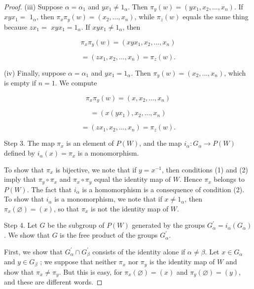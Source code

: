 \begin{proof}
(iii) Suppose \(\alpha = {\alpha }_{1}\) and \(yx_{1} \neq {1}_{\alpha }\). Then \({\pi }_{y}( w) = ( {yx_{1},x_{2},\ldots ,x_{n}})\). If \({xy}x_{1} =\) \(1_{\alpha }\), then \({\pi }_{x}{\pi }_{y}( w) = ( {x_{2},\ldots ,x_{n}})\), while \({\pi }_{z}( w)\) equals the same thing because \(zx_{1} =\) \({xy}x_{1} = 1_{\alpha }\). If \({xy}x_{1} \neq {1}_{\alpha }\), then

\[
{\pi }_{x}{\pi }_{y}( w) = ( {{xy}x_{1},x_{2},\ldots ,x_{n}})
\]

\[
= ( {zx_{1},x_{2},\ldots ,x_{n}}) = {\pi }_{z}( w).
\]

(iv) Finally, suppose \(\alpha = {\alpha }_{1}\) and \(yx_{1} = 1_{\alpha }\). Then \({\pi }_{y}( w) = ( {x_{2},\ldots ,x_{n}})\), which is empty if \(n = 1\). We compute

\[
{\pi }_{x}{\pi }_{y}( w) = ( {x,x_{2},\ldots ,x_{n}})
\]

\[
= ( {x( {yx_{1}}),x_{2},\ldots ,x_{n}})
\]

\[
= ( {zx_{1},x_{2},\ldots ,x_{n}}) = {\pi }_{z}( w).
\]

Step 3. The map \({\pi }_{x}\) is an element of \(P( W)\), and the map \(i_{\alpha } : G_{\alpha } \rightarrow P( W)\) defined by \(i_{\alpha }(x) = {\pi }_{x}\) is a monomorphism.

To show that \({\pi }_{x}\) is bijective, we note that if \(y = x^{-1}\), then conditions (1) and (2) imply that \({\pi }_{y} \circ {\pi }_{x}\) and \({\pi }_{x} \circ {\pi }_{y}\) equal the identity map of \(W\). Hence \({\pi }_{x}\) belongs to \(P( W)\). The fact that \(i_{\alpha }\) is a homomorphism is a consequence of condition (2). To show that \(i_{\alpha }\) is a monomorphism, we note that if \(x \neq {1}_{\alpha }\), then \({\pi }_{x}( \varnothing ) = (x)\), so that \({\pi }_{x}\) is not the identity map of \(W\).

Step 4. Let \(G\) be the subgroup of \(P( W)\) generated by the groups \(G_{\alpha }^{\prime } = i_{\alpha }( G_{\alpha })\). We show that \(G\) is the free product of the groups \(G_{\alpha }^{\prime }\).

First, we show that \(G_{\alpha }^{\prime } \cap {G}_{\beta }^{\prime }\) consists of the identity alone if \(\alpha \neq \beta\). Let \(x \in {G}_{\alpha }\) and \(y \in {G}_{\beta }\) ; we suppose that neither \({\pi }_{x}\) nor \({\pi }_{y}\) is the identity map of \(W\) and show that \({\pi }_{x} \neq {\pi }_{y}\). But this is easy, for \({\pi }_{x}( \varnothing ) = (x)\) and \({\pi }_{y}( \varnothing ) = ( y)\), and these are different words.


\end{proof}
